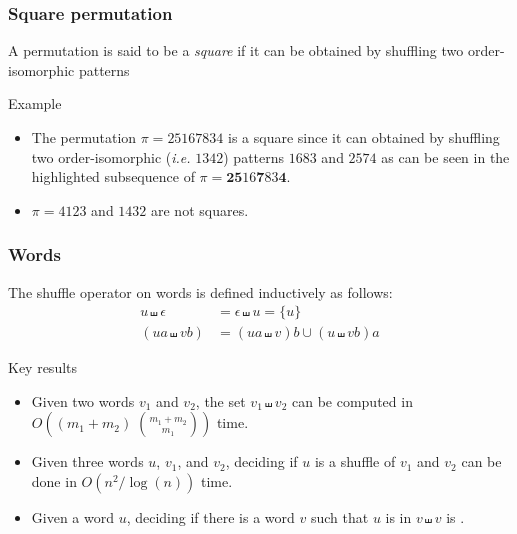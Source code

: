 \documentclass[unknownkeysallowed,10pt,xcolor={dvipsnames}]{beamer}
\begin{document}
\begin{frame}
  \frametitle{Square permutation}

  \begin{definition}
    A permutation is said to be a \emph{square} if it can be obtained by
    shuffling two order-isomorphic patterns
  \end{definition}

  \medskip

  \begin{exampleblock}{Example}
    \begin{itemize}
      \item
        The permutation $\pi = 25167834$ is a square since it can obtained by
        shuffling two order-isomorphic (\emph{i.e.} $1342$)
        patterns $1683$ and $2574$ as can be seen in the highlighted subsequence of
        $\pi = \mathbf{25}16\mathbf{7}83\mathbf{4}$.

      \medskip

      \item
       $\pi = 4123$ and $1432$ are not squares.
    \end{itemize}
  \end{exampleblock}

\end{frame}


\begin{frame}
  \frametitle{Words}

  \begin{definition}
    The shuffle operator on words is defined inductively as follows:
    \begin{align*}
      u \shuffle \epsilon &= \epsilon \shuffle u = \{u\}
      \\
      (ua \shuffle vb) &= (ua \shuffle v)b \cup (u \shuffle vb)a
    \end{align*}
  \end{definition}

  \medskip

  \begin{block}{Key results}
    \begin{itemize}
      \item
      Given two words $v_1$ and $v_2$, the set $v_1 \shuffle v_2$
      can be computed in
      $O\left((m_1 + m_2) \; \binom{m_1 + m_2}{m_1}\right)$
      time.

      \smallskip

      \item
      Given three words $u$, $v_1$, and $v_2$, deciding if $u$ is a shuffle
      of $v_1$ and $v_2$ can be done in
      $O\left(n^2 / \log(n)\right)$ time.

      \smallskip

      \item
      Given a word $u$, deciding if there is a word $v$ such that $u$ is
      in $v \shuffle v$ is \NPC.
    \end{itemize}
  \end{block}

\end{frame}
\end{document}
